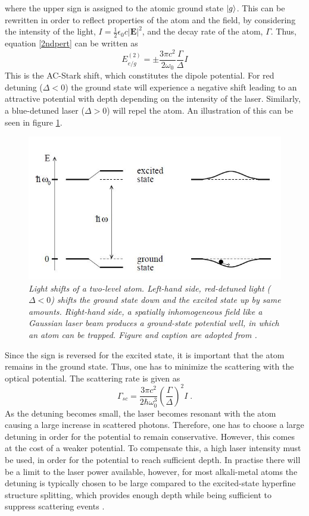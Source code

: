 where the upper sign is assigned to the atomic ground state $\ket{g}$. This can be rewritten in order to reflect properties of the atom and the field, by considering the intensity of the light, $I = \frac{1}{2} \epsilon_0 c |\boldsymbol{E}|^2 $, and the decay rate of the atom, $\Gamma$. Thus, equation \eqref{2ndpert} can be written as \cite{grimm} 
\begin{equation}
	E_{e/g}^{(2)}=\pm \frac{3 \pi c^2}{2 \omega_0} \frac{\Gamma}{\Delta}I
	\label{eq:dipolepot}
\end{equation}
This is the AC-Stark shift, which constitutes the dipole potential. For red detuning ($\Delta < 0$) the ground state will experience a negative shift leading to an attractive potential with depth depending on the intensity of the laser. Similarly, a blue-detuned laser ($\Delta > 0$) will repel the atom. An illustration of this can be seen in figure \ref{fig:ac_stark}.
\begin{figure}[!h]
	\centering
	\includegraphics[width=0.5\columnwidth]{Figures/acstark.JPG} 
	\caption{\textit{Light shifts of a two-level atom. Left-hand side,
		red-detuned light ($\Delta < 0$) shifts the ground state down and the
		excited state up by same amounts. Right-hand side, a spatially
		inhomogeneous field like a Gaussian laser beam produces a
		ground-state potential well, in which an atom can be trapped. Figure and 		caption are adopted from \cite{grimm}.}}
	\label{fig:ac_stark} 
\end{figure}
Since the sign is reversed for the excited state, it is important that the atom remains in the ground state. Thus, one has to minimize the scattering with the optical potential. The scattering rate is given as \cite{grimm}
\begin{equation}
	\Gamma_{sc} = \frac{3 \pi c^2}{2 \hbar \omega_{0}^3} \left( \frac{\Gamma}{\Delta} \right) ^2 I \; .
\end{equation}
As the detuning becomes small, the laser becomes resonant with the atom causing a large increase in scattered photons. Therefore, one has to choose a large detuning in order for the potential to remain conservative. However, this comes at the cost of a weaker potential. To compensate this, a high laser intensity must be used, in order for the potential to reach sufficient depth. In practise there will be a limit to the laser power available, however, for most alkali-metal atoms the detuning is typically chosen to be large compared to the excited-state hyperfine structure splitting, which provides enough depth while being sufficient to suppress scattering events \cite{manybodyBloch}. 


